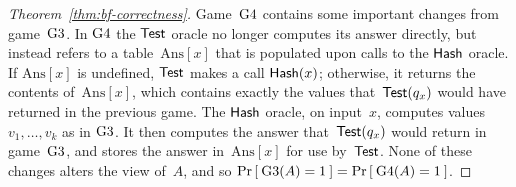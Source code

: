 \begin{proof}[Theorem~\ref{thm:bf-correctness}]
Game~$\text{G4}$ contains some important changes from
game~$\text{G3}$. In $\text{G4}$ the $\mathsf{Test}$ oracle no longer
computes its answer directly, but instead refers to a
table~$\mathrm{Ans}[x]$ that is populated upon calls to the
$\mathsf{Hash}$ oracle.  If $\mathrm{Ans}[x]$ is undefined,
$\mathsf{Test}$ makes a call $\mathsf{Hash}(x)$; otherwise, it returns
the contents of~$\mathrm{Ans}[x]$, which contains exactly the values
that~$\mathsf{Test}(q_x)$ would have returned in the previous game.
The $\mathsf{Hash}$ oracle, on input~$x$, computes
values~$v_1,\ldots,v_k$ as in $\text{G3}$. %
It then computes the answer that~$\mathsf{Test}(q_x)$ would return in
game~$\text{G3}$, and stores the answer in~$\mathrm{Ans}[x]$ for use
by~$\mathsf{Test}$. None of these changes alters the view of~$A$, and
so $\Pr\left[\: \text{G3}(A) = 1 \:\right] = \Pr\left[\: \text{G4}(A)
  = 1 \:\right]$. 


\end{proof}
